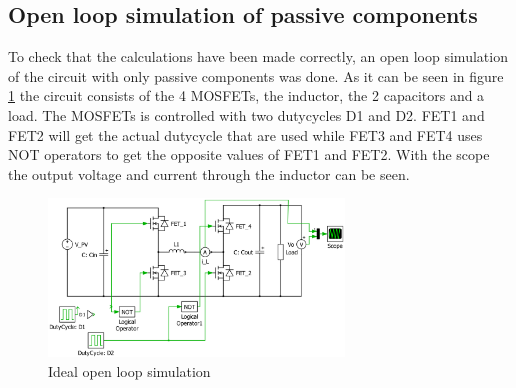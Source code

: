 \subsection{Open loop simulation of passive components}

To check that the calculations have been made correctly, an open loop simulation of the circuit with only passive components was done. As it can be seen in figure \ref{openloop} the circuit consists of the 4 MOSFETs, the inductor, the 2 capacitors and a load. The MOSFETs is controlled with two dutycycles D1 and D2. FET1 and FET2 will get the actual dutycycle that are used while FET3 and FET4 uses NOT operators to get the opposite values of FET1 and FET2. With the scope the output voltage and current through the inductor can be seen.

\begin{figure}[H]
	\begin{center}
		\includegraphics[width=0.7\textwidth]{../Pictures/openloop}
		\caption{Ideal open loop simulation}
		\label{openloop}
	\end{center}
\end{figure}

